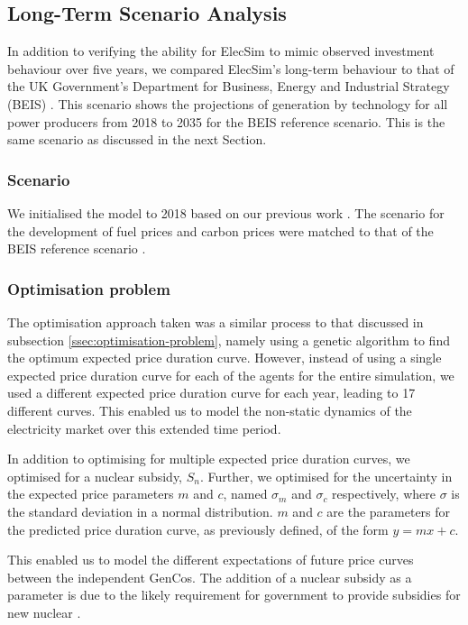 \subsection{Long-Term Scenario Analysis}
\label{sssec:scen-analysis}

In addition to verifying the ability for ElecSim to mimic observed investment behaviour over five years, we compared ElecSim's long-term behaviour to that of the UK Government's Department for Business, Energy and Industrial Strategy (BEIS) \cite{DBEIS2019}. This scenario shows the projections of generation by technology for all power producers from 2018 to 2035 for the BEIS reference scenario. This is the same scenario as discussed in the next Section.

\subsubsection{Scenario}
\label{sssec:scenario-details}

We initialised the model to 2018 based on our previous work \cite{Kell}. The scenario for the development of fuel prices and carbon prices were matched to that of the BEIS reference scenario \cite{DBEIS2019}.


\subsubsection{Optimisation problem} The optimisation approach taken was a similar process to that discussed in subsection \ref{ssec:optimisation-problem}, namely using a genetic algorithm to find the optimum expected price duration curve. However, instead of using a single expected price duration curve for each of the agents for the entire simulation, we used a different expected price duration curve for each year, leading to 17 different curves. This enabled us to model the non-static dynamics of the electricity market over this extended time period. 

In addition to optimising for multiple expected price duration curves, we optimised for a nuclear subsidy, $S_n$. Further, we optimised for the uncertainty in the expected price parameters $m$ and $c$, named $\sigma_m$ and $\sigma_c$ respectively, where $\sigma$ is the standard deviation in a normal distribution. $m$ and $c$ are the parameters for the predicted price duration curve, as previously defined, of the form $y=mx+c$.  

This enabled us to model the different expectations of future price curves between the independent GenCos. The addition of a nuclear subsidy as a parameter is due to the likely requirement for government to provide subsidies for new nuclear \cite{Suna2016}.

